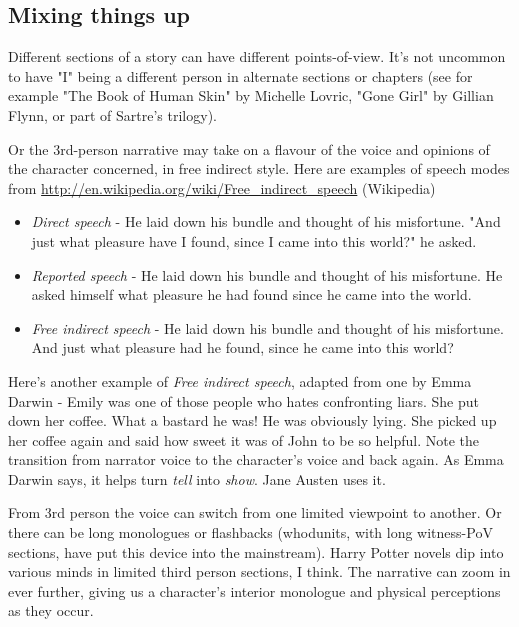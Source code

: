 \documentclass[11pt]{article}
\begin{document}
\subsection*{Mixing things up}
Different sections of a story can have different points-of-view. It's not uncommon to have "I" being a different person in alternate sections or chapters (see for example "The Book of Human Skin" by Michelle Lovric, "Gone Girl" by Gillian Flynn, or part of Sartre's trilogy).


 Or the 3rd-person narrative may take on a flavour of the voice and opinions of the character concerned, in free indirect style. Here are examples of speech modes from \url{http://en.wikipedia.org/wiki/Free_indirect_speech} (Wikipedia)


\begin{itemize}
\item \textit{Direct speech} - He laid down his bundle and thought of his misfortune. "And just what pleasure have I found, since I came into this world?" he asked.
\item \textit{Reported speech} - He laid down his bundle and thought of his misfortune. He asked himself what pleasure he had found since he came into the world.
\item \textit{Free indirect speech} - He laid down his bundle and thought of his misfortune. And just what pleasure had he found, since he came into this world?
\end{itemize}
Here's another example of \textit{Free indirect speech}, adapted from one by Emma Darwin -  
Emily was one of those people who hates confronting liars. She put down her coffee. What a bastard he was! He was obviously lying. She picked up her coffee again and said how sweet it was of John to be so helpful. 
Note the transition from narrator voice to the character's voice and back again. As Emma Darwin says, it helps turn \textit{tell} into \textit{show}. Jane Austen uses it.



From 3rd person the voice can switch from one limited viewpoint to another. Or there can be long monologues or flashbacks (whodunits, with long witness-PoV sections, have put this device into the mainstream). Harry Potter novels dip into various minds in limited third person sections, I think. The narrative can zoom in ever further, giving us a character's interior monologue and physical perceptions as they occur. 
\end{document}
